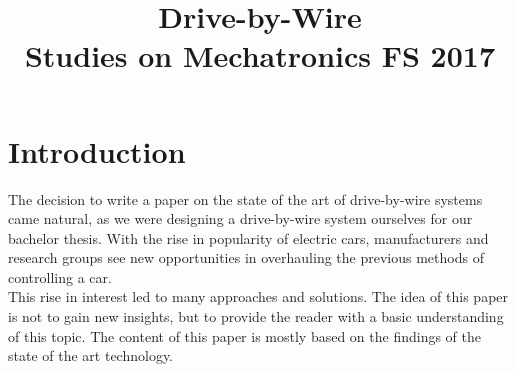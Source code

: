 \documentclass[conference]{IEEEtran}
\begin{document}
\title{
Drive-by-Wire
\\[0.5cm]
\large{Studies on Mechatronics FS 2017}
}

\author{
\and

}

\maketitle

\setlength\parindent{0pt}
\newcommand{\spn}[1]{\textsc{Span} \left\{ #1 \right\}}
\newcommand{\dimension}[1]{\textsc{dim} \left\{ #1 \right\}}
\newcommand{\real}[1]{\textsc{Re} \left( #1 \right)}
\newcommand{\imag}[1]{\textsc{Im} \left( #1 \right)}
\newcommand{\DET}[1]{\textsc{Det} \left[ #1 \right]}
\newcommand*\rfrac[2]{{}^{#1}\!/_{#2}}


\thispagestyle{plain}
\pagestyle{plain}



\section{Introduction}

The decision to write a paper on the state of the art of drive-by-wire systems came natural, as we were designing a drive-by-wire system ourselves for our bachelor thesis. With the rise in popularity of electric cars, manufacturers and research groups see new opportunities in overhauling the previous methods of controlling a car.\\
This rise in interest led to many approaches and solutions. The idea of this paper is not to gain new insights, but to provide the reader with a basic understanding of this topic. The content of this paper is mostly based on the findings of the state of the art technology.
\end{document}
